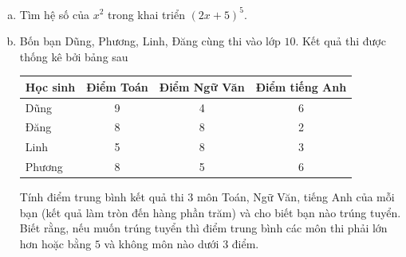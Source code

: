\begin{bt}%
	\begin{enumerate}[a)]
		\item Tìm hệ số của $x^{2}$ trong khai triển $(2x+5)^{5}$.
		\item Bốn bạn Dũng, Phương, Linh, Đăng cùng thi vào lớp $10$. Kết quả thi được thống kê bởi bảng sau
			\begin{center}
				\begin{tabular}{|l|c|c|c|}
					\hline
					Học sinh & Điểm Toán & Điểm Ngữ Văn & Điểm tiếng Anh\\
					\hline
					Dũng & 9 & 4 & 6\\
					\hline
					Đăng & 8 & 8 & 2\\
					\hline
					Linh & 5 & 8 & 3\\
					\hline
					Phương & 8 & 5 & 6\\
					\hline
				\end{tabular}
			\end{center}
			Tính điểm trung bình kết quả thi $3$ môn Toán, Ngữ Văn, tiếng Anh của mỗi bạn (kết quả làm tròn đến hàng phần trăm) và cho biết bạn nào trúng tuyển. Biết rằng, nếu muốn trúng tuyển thì điểm trung bình các môn thi phải lớn hơn hoặc bằng $5$ và không môn nào dưới $3$ điểm.
	\end{enumerate}
\end{bt}

